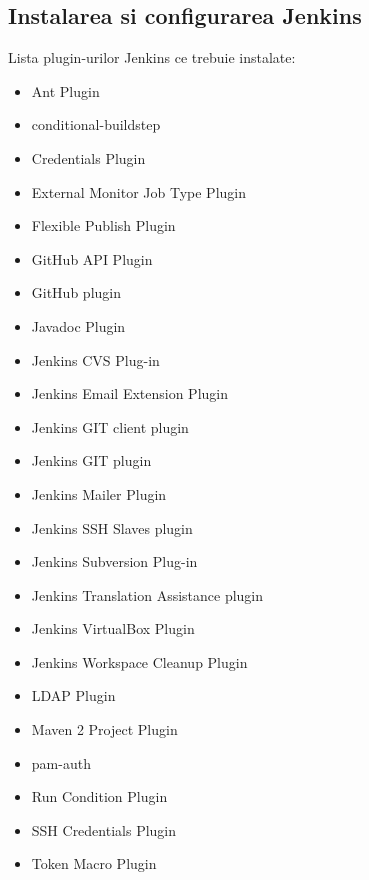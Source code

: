 \subsection{Instalarea si configurarea Jenkins}

Lista plugin-urilor Jenkins ce trebuie instalate:
\begin{itemize}
\item 
Ant Plugin
\item
conditional-buildstep
\item
Credentials Plugin
\item
External Monitor Job Type Plugin
\item
Flexible Publish Plugin
\item
GitHub API Plugin
\item
GitHub plugin
\item
Javadoc Plugin
\item
Jenkins CVS Plug-in
\item
Jenkins Email Extension Plugin
\item
Jenkins GIT client plugin
\item
Jenkins GIT plugin
\item
Jenkins Mailer Plugin
\item
Jenkins SSH Slaves plugin
\item
Jenkins Subversion Plug-in
\item
Jenkins Translation Assistance plugin
\item
Jenkins VirtualBox Plugin
\item
Jenkins Workspace Cleanup Plugin
\item
LDAP Plugin
\item
Maven 2 Project Plugin
\item
pam-auth
\item
Run Condition Plugin
\item
SSH Credentials Plugin
\item
Token Macro Plugin
\end{itemize}

